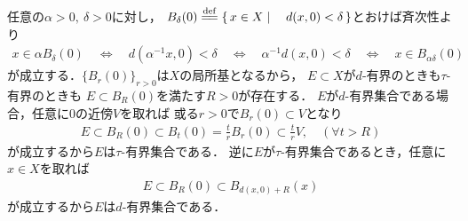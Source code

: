 	\begin{prf}
		任意の$\alpha>0,\ \delta>0$に対し，
		$B_{\delta}(0) \defeq \Set{x \in X}{d(x,0) < \delta}$とおけば斉次性より
		\begin{align}
			x \in \alpha B_{\delta}(0) 
			\quad \Longleftrightarrow \quad d\left( \alpha^{-1}x,0 \right) < \delta
			\quad \Longleftrightarrow \quad \alpha^{-1}d(x,0) < \delta
			\quad \Longleftrightarrow \quad x \in B_{\alpha\delta}(0)
		\end{align}
		が成立する．$\{B_r(0)\}_{r > 0}$は$X$の局所基となるから，
		$E \subset X$が$d$-有界のときも$\tau$-有界のときも
		$E \subset B_R(0)$を満たす$R > 0$が存在する．
		$E$が$d$-有界集合である場合，任意に0の近傍$V$を取れば
		或る$r > 0$で$B_r(0) \subset V$となり
		\begin{align}
			E \subset B_R(0) \subset B_t(0) = \frac{t}{r} B_r(0) \subset \frac{t}{r}V,
			\quad (\forall t > R)
		\end{align}
		が成立するから$E$は$\tau$-有界集合である．
		逆に$E$が$\tau$-有界集合であるとき，任意に$x \in X$を取れば
		\begin{align}
			E \subset B_R(0) \subset B_{d(x,0) + R}(x)
		\end{align}
		が成立するから$E$は$d$-有界集合である．
		\QED
	\end{prf}
	
